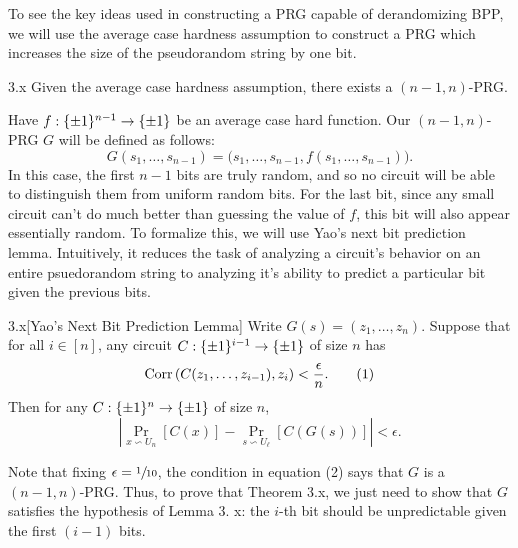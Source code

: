 \documentclass[11pt]{article}
\begin{document}
To see the key ideas used in constructing a PRG capable of derandomizing BPP, we will use the average case hardness assumption to construct a PRG which increases the size of the pseudorandom string by one bit.

\begin{theorem}{3.x}
    Given the average case hardness assumption, there exists a $(n - 1, n)$-PRG.
\end{theorem}
\noindent
Have $f : \{\pm 1\}^{n - 1} \rightarrow \{\pm 1\}$ be an average case hard function. Our $(n - 1, n)$-PRG $G$ will be defined as follows:
\begin{equation*}
    G(s_1, \ldots, s_{n - 1}) = \bigl(s_1, \ldots, s_{n - 1}, f(s_1, \ldots, s_{n - 1})\bigr).
\end{equation*}
In this case, the first $n - 1$ bits are truly random, and so no circuit will be able to distinguish them from uniform random bits. For the last bit, since any small circuit can't do much better than guessing the value of $f$, this bit will also appear essentially random. To formalize this, we will use Yao's next bit prediction lemma. Intuitively, it reduces the task of analyzing a circuit's behavior on an entire psuedorandom string to analyzing it's ability to predict a particular bit given the previous bits.
\begin{lemma}{3.x}[Yao's Next Bit Prediction Lemma]
    Write $G(s) = (z_1, \ldots, z_n)$. Suppose that for all $i \in [n]$, any circuit $C : \{\pm 1\}^{i - 1} \rightarrow \{\pm 1\}$ of size $n$ has 
    \begin{equation*}
        \mathrm{Corr}\left(C(z_1, \ldots, z_{i - 1}), z_i\right) < \frac{\epsilon}{n}. \tag{1}
    \end{equation*}
    Then for any $C : \{\pm 1\}^n \rightarrow \{\pm 1\}$ of size $n$, 
    \begin{equation*}
        \left|\Pr_{x \backsim U_n}[C(x)] - \Pr_{s \backsim U_\ell}[C(G(s))]\right| < \epsilon. \tag{2}
    \end{equation*}
\end{lemma}
Note that fixing $\epsilon = \sfrac{1}{10}$, the condition in equation (2) says that $G$ is a $(n - 1, n)$-PRG. Thus, to prove that Theorem 3.x, we just need to show that $G$ satisfies the hypothesis of Lemma 3. x: the $i$-th bit should be unpredictable given the first $(i - 1)$ bits.
\end{document}
